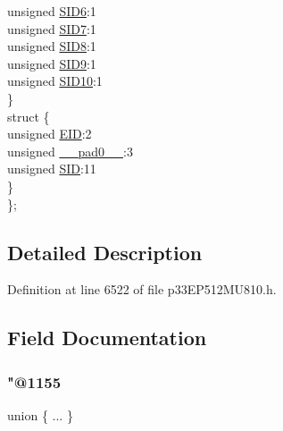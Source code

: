 \begin{DoxyCompactItemize}
\begin{tabbing}
\>\>unsigned \hyperlink{structtag_c2_r_x_f6_s_i_d_b_i_t_s_a70d70952133eb2389d5c326f9f0e8035}{SID6}:1\\
\>\>unsigned \hyperlink{structtag_c2_r_x_f6_s_i_d_b_i_t_s_a34097fb76decd431701fa2d86a22328e}{SID7}:1\\
\>\>unsigned \hyperlink{structtag_c2_r_x_f6_s_i_d_b_i_t_s_afe74894633244fdb0b0c01b4e8c522e7}{SID8}:1\\
\>\>unsigned \hyperlink{structtag_c2_r_x_f6_s_i_d_b_i_t_s_a33587704948067005c2a6a3ccc503c99}{SID9}:1\\
\>\>unsigned \hyperlink{structtag_c2_r_x_f6_s_i_d_b_i_t_s_a1a9084031c7f5fb16007feeebf0d8216}{SID10}:1\\
\>\} \\
\>struct \{\\
\>\>unsigned \hyperlink{structtag_c2_r_x_f6_s_i_d_b_i_t_s_ae80b378c9141f7c03e0b4e55b5f4b54d}{EID}:2\\
\>\>unsigned \hyperlink{structtag_c2_r_x_f6_s_i_d_b_i_t_s_adf71f3d8410c1f1dbbc96680a92c49af}{\_\_pad0\_\_}:3\\
\>\>unsigned \hyperlink{structtag_c2_r_x_f6_s_i_d_b_i_t_s_af88edf93b2fee2432665bd84f51287e4}{SID}:11\\
\>\} \\
\}; \\

\end{tabbing}\end{DoxyCompactItemize}


\subsection{Detailed Description}


Definition at line 6522 of file p33\+E\+P512\+M\+U810.\+h.



\subsection{Field Documentation}
\mbox{\label{structtag_c2_r_x_f6_s_i_d_b_i_t_s_a1016124f6f7744aea441bcef8c0123bd}} 
\subsubsection{\texorpdfstring{"@1155}{@1155}}
{\footnotesize\ttfamily union \{ ... \} }

\mbox{\label{structtag_c2_r_x_f6_s_i_d_b_i_t_s_adf71f3d8410c1f1dbbc96680a92c49af}} 
